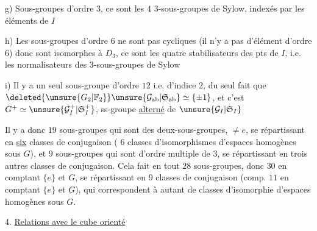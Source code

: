 g) Sous-groupes d'ordre $3$, ce sont les $4$ $3$-sous-groupes de Sylow, indexés par les éléments de $I$

h) Les sous-groupes d'ordre $6$ ne sont pas cycliques (il n'y a pas d'élément d'ordre $6$) donc sont isomorphes à $D_3$,  ce sont les quatre stabilisateurs des pts de $I$, i.e. les normalisateurs des $3$-sous-groupes de Sylow

i) Il y a un seul sous-groupe d'ordre $12$ i.e. d'indice $2$, du seul fait que $\deleted{\unsure{G_2|\mathbb{F}_2}}\unsure{\mathcal{G}_{\mathrm{ab}}|\mathfrak{S}_{\mathrm{ab}}}\simeq\{\pm1\}$, et c'est $G^+\simeq\unsure{\mathcal{G}_I^+|\mathfrak{S}_I^+}$, ss-groupe \uline{alterné} de $\unsure{\mathcal{G}_I|\mathfrak{S}_I}$

Il y a donc  $19$ sous-groupes qui sont des deux-sous-groupes, $\ne e$, se répartissant en \uline{six} classes de conjugaison ( $6$ classes d'isomorphismes d'espaces homogènes sous $G$), et $9$ sous-groupes  qui sont d'ordre multiple de $3$, se répartissant en trois autres classes de conjugaison. Cela fait en tout $28$ sous-groupes, donc $30$ en comptant $\{e\}$ et $G$, se répartissant en $9$ classes de conjugaison (comp. $11$ en comptant $\{e\}$ et $G$), qui correspondent à autant de classes d'isomorphie d'espaces homogènes sous $G$.

4. \uline{Relations avec le cube orienté}

